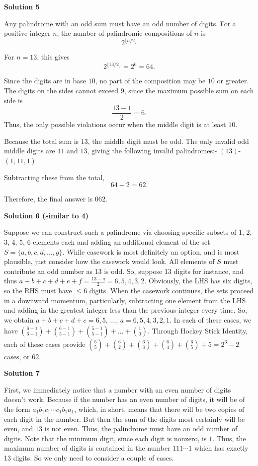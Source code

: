 \begin{enumerate}
 



\textbf{Solution 5}

Any palindrome with an odd sum must have an odd number of digits. For a positive integer $n$, the number of palindromic compositions of $n$ is
 \[2^{\lfloor n/2 \rfloor}\]

 For $n=13$, this gives
 \[2^{\lfloor 13/2 \rfloor} = 2^6 = 64.\]

 Since the digits are in base $10$, no part of the composition may be $10$ or greater. The digits on the sides cannot exceed $9$, since the maximum possible sum on each side is
 \[\frac{13-1}{2} = 6.\]Thus, the only possible violations occur when the middle digit is at least $10$.

 Because the total sum is $13$, the middle digit must be odd. The only invalid odd middle digits are $11$ and $13$, giving the following invalid palindromes:- $(13)$- $(1,11,1)$

 Subtracting these from the total,
 \[64 - 2 = 62.\]

 Therefore, the final answer is $\boxed{062}$.

 



\textbf{Solution 6 (similar to 4)}

Suppose we can construct such a palindrome via choosing specific subsets of 1, 2, 3, 4, 5, 6 elements each and adding an additional element of the set $S = \{a,b,c,d,\dots,g \}$. While casework is most definitely an option, and is most plausible, just consider how the casework would look. All elements of $S$ must contribute an odd number as 13 is odd. So, suppose 13 digits for instance, and thus $a+b+c+d+e+f = \frac{13-g}{2} = 6,5,4,3,2$. Obviously, the LHS has six digits, so the RHS must have $\le 6$ digits. When the casework continues, the sets proceed in a downward momentum, particularly, subtracting one element from the LHS and adding in the greatest integer less than the previous integer every time. So, we obtain $a+b+c+d+e = 6,5$, $\dots$, $a = 6,5,4,3,2,1$. In each of these cases, we have $\binom{6-1}{6-1} + \binom{6-1}{5-1} + \binom{5-1}{5-1} + \dots + \binom{1}{0}$. Through Hockey Stick Identity, each of these cases provide $\binom{5}{5} + \binom{6}{2} + \binom{6}{3} + \binom{6}{4} + \binom{6}{5} + 5 = 2^6 - 2$ cases, or $\boxed{62}$.

 



\textbf{Solution 7}

First, we immediately notice that a number with an even number of digits doesn't work. Because if the number has an even number of digits, it will be of the form $a_1 b_1 c_1 \cdots c_1 b_1 a_1$, which, in short, means that there will be two copies of each digit in the number. But then the sum of the digits most certainly will be even, and $13$ is not even. Thus, the palindrome must have an odd number of digits. Note that the minimum digit, since each digit is nonzero, is $1$. Thus, the maximum number of digits is contained in the number $111\cdots1$ which has exactly 13 digits. So we only need to consider a couple of cases.


\end{enumerate}
